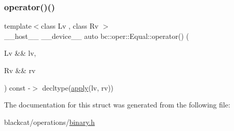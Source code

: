 \mbox{\label{structbc_1_1oper_1_1Equal_acd42caec9e367215f0f3bbc224d8528d}} 
\subsubsection{\texorpdfstring{operator()()}{operator()()}}
{\footnotesize\ttfamily template$<$class Lv , class Rv $>$ \\
\+\_\+\+\_\+host\+\_\+\+\_\+ \+\_\+\+\_\+device\+\_\+\+\_\+ auto bc\+::oper\+::\+Equal\+::operator() (\begin{DoxyParamCaption}\item[{Lv \&\&}]{lv,  }\item[{Rv \&\&}]{rv }\end{DoxyParamCaption}) const -\/$>$ decltype(\hyperlink{structbc_1_1oper_1_1Equal_a7802e80388c013e0af1436d6273914f4}{apply}(lv, rv)) \hspace{0.3cm}{\ttfamily [inline]}}



The documentation for this struct was generated from the following file\+:\begin{DoxyCompactItemize}
\item 
blackcat/operations/\hyperlink{binary_8h}{binary.\+h}\end{DoxyCompactItemize}
